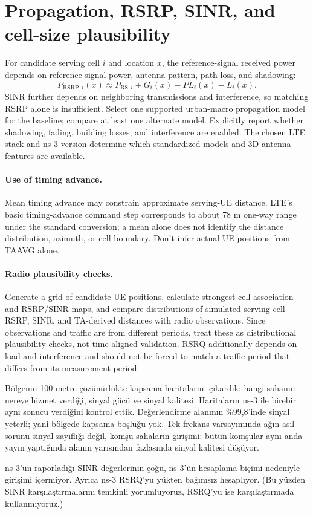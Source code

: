 \documentclass[11pt,a4paper]{article}
\newenvironment{progress}{\par\smallskip\color{blue}}{\par\smallskip}
\begin{document}
\section{Propagation, RSRP, SINR, and cell-size plausibility}
\label{sec:prop}
For candidate serving cell $i$ and location $x$, the reference-signal received power depends on reference-signal power, antenna pattern, path loss, and shadowing:
\begin{equation}
P_{\mathrm{RSRP},i}(x)\approx P_{\mathrm{RS},i}+G_i(x)-PL_i(x)-L_i(x).
\end{equation}
SINR further depends on neighboring transmissions and interference, so matching RSRP alone is insufficient. Select one supported urban-macro propagation model for the baseline; compare at least one alternate model. Explicitly report whether shadowing, fading, building losses, and interference are enabled. The chosen LTE stack and ns-3 version determine which standardized models and 3D antenna features are available.

\paragraph{Use of timing advance.} Mean timing advance may constrain approximate serving-UE distance. LTE's basic timing-advance command step corresponds to about 78 m one-way range under the standard conversion; a mean alone does not identify the distance distribution, azimuth, or cell boundary. Don't infer actual UE positions from TAAVG alone.

\paragraph{Radio plausibility checks.} Generate a grid of candidate UE positions, calculate strongest-cell association and RSRP/SINR maps, and compare distributions of simulated serving-cell RSRP, SINR, and TA-derived distances with radio observations. Since observations and traffic are from different periods, treat these as distributional plausibility checks, not time-aligned validation. RSRQ additionally depends on load and interference and should not be forced to match a traffic period that differs from its measurement period.

\begin{progress}
Bölgenin 100 metre çözünürlükte kapsama haritalarını çıkardık: hangi sahanın nereye hizmet verdiği, sinyal gücü ve sinyal kalitesi. Haritaların ns-3 ile birebir aynı sonucu verdiğini kontrol ettik. Değerlendirme alanının \%99,8'inde sinyal yeterli; yani bölgede kapsama boşluğu yok. Tek frekans varsayımında ağın asıl sorunu sinyal zayıflığı değil, komşu sahaların girişimi: bütün komşular aynı anda yayın yaptığında alanın yarısından fazlasında sinyal kalitesi düşüyor.

ns-3'ün raporladığı SINR değerlerinin çoğu, ns-3'ün hesaplama biçimi nedeniyle girişimi içermiyor. Ayrıca ns-3 RSRQ'yu yükten bağımsız hesaplıyor. (Bu yüzden SINR karşılaştırmalarını temkinli yorumluyoruz, RSRQ'yu ise karşılaştırmada kullanmıyoruz.)
\end{progress}
\end{document}
